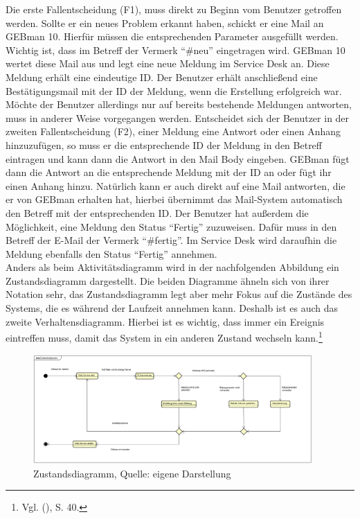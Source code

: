 \noindent
Die erste Fallentscheidung (F1), muss direkt zu Beginn vom Benutzer getroffen werden. \newline
Sollte er ein neues Problem erkannt haben, schickt er eine Mail an GEBman 10. Hierfür müssen die entsprechenden Parameter ausgefüllt werden. Wichtig ist, dass im Betreff der Vermerk \enquote{\#neu} eingetragen wird. GEBman 10 wertet diese Mail aus und legt eine neue Meldung im Service Desk an. Diese Meldung erhält eine eindeutige ID. Der Benutzer erhält anschließend eine Bestätigungsmail mit der ID der Meldung, wenn die Erstellung erfolgreich war.\newline
Möchte der Benutzer allerdings nur auf bereits bestehende Meldungen antworten, muss in anderer Weise vorgegangen werden. Entscheidet sich der Benutzer in der zweiten Fallentscheidung (F2), einer Meldung eine Antwort oder einen Anhang hinzuzufügen, so muss er die entsprechende ID der Meldung in den Betreff eintragen und kann dann die Antwort in den Mail Body eingeben. GEBman fügt dann die Antwort an die entsprechende Meldung mit der ID an oder fügt ihr einen Anhang hinzu.\newline
Natürlich kann er auch direkt auf eine Mail antworten, die er von GEBman erhalten hat, hierbei übernimmt das Mail-System automatisch den Betreff mit der entsprechenden ID. Der Benutzer hat außerdem die Möglichkeit, eine Meldung den Status \enquote{Fertig} zuzuweisen. Dafür muss in den Betreff der E-Mail der Vermerk \enquote{\#fertig}. Im Service Desk wird daraufhin die Meldung ebenfalls den Status \enquote{Fertig} annehmen.\\

\noindent
Anders als beim Aktivitätsdiagramm wird in der nachfolgenden Abbildung ein Zustandsdiagramm dargestellt. Die beiden Diagramme ähneln sich von ihrer Notation sehr, das Zustandsdiagramm legt aber mehr Fokus auf die Zustände des Systems, die es während der Laufzeit annehmen kann. Deshalb ist es auch das zweite Verhaltensdiagramm. Hierbei ist es wichtig, dass immer ein Ereignis eintreffen muss, damit das System in ein anderen Zustand wechseln kann.\footnote{Vgl. \citeauthor{Balzert} (\citeyear{Balzert}), S. 40.}

\begin{figure}[h!]
\centering
\includegraphics[width=0.95\textwidth]{Abbildungen/Zustandsdiagramm.png}
	\caption[Zustandsdiagramm]{Zustandsdiagramm, Quelle: eigene Darstellung}
	\label{fig:Zustandsdiagramm}
\end{figure}

